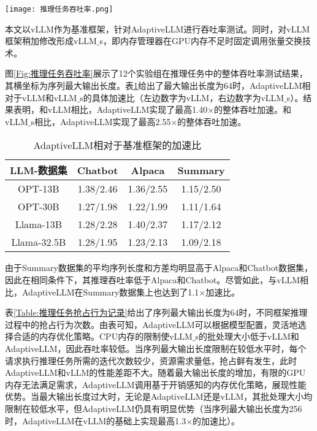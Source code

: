 \begin{figure*}[!htbp]
  \centering
  \texttt{[image: 推理任务吞吐率.png]}
  \caption{推理任务吞吐率}
  \label{Fig:推理任务吞吐率}
\end{figure*}

本文以vLLM作为基准框架，针对AdaptiveLLM进行吞吐率测试。同时，对vLLM框架稍加修改形成vLLM$\_$s，即内存管理器在GPU内存不足时固定调用张量交换技术。

图\ref{Fig:推理任务吞吐率}展示了12个实验组在推理任务中的整体吞吐率测试结果，其横坐标为序列最大输出长度。表\ref{Table:AdaptiveLLM相对于基准框架的加速比}给出了最大输出长度为64时，AdaptiveLLM相对于vLLM和vLLM$\_$s的具体加速比（左边数字为vLLM，右边数字为vLLM$\_$s）。结果表明，和vLLM相比，AdaptiveLLM实现了最高1.40$\times$的整体吞吐加速。和vLLM$\_$s相比，AdaptiveLLM实现了最高2.55$\times$的整体吞吐加速。

\begin{table}[H]
  \centering
  \caption{AdaptiveLLM相对于基准框架的加速比}
  \label{Table:AdaptiveLLM相对于基准框架的加速比}
  \renewcommand{\arraystretch}{1.25}
  \small
  \begin{tabular}{c c c c}
    \toprule
    \textbf{LLM-数据集} & \textbf{Chatbot} & \textbf{Alpaca} & \textbf{Summary} \\
    \midrule
    OPT-13B	& 1.38/2.46 & 1.36/2.55 & 1.15/2.50 \\
    OPT-30B	& 1.27/1.98 & 1.22/1.99 & 1.11/1.64 \\
    Llama-13B & 1.28/2.28 & 1.40/2.37 & 1.17/2.12 \\
    Llama-32.5B & 1.28/1.95 & 1.23/2.13 & 1.09/2.18 \\
    \bottomrule
  \end{tabular}
\end{table}

由于Summary数据集的平均序列长度和方差均明显高于Alpaca和Chatbot数据集，因此在相同条件下，其推理吞吐率低于Alpaca和Chatbot。尽管如此，与vLLM相比，AdaptiveLLM在Summary数据集上也达到了1.1$\times$加速比。

表\ref{Table:推理任务抢占行为记录}给出了序列最大输出长度为64时，不同框架推理过程中的抢占行为次数。由表可知，AdaptiveLLM可以根据模型配置，灵活地选择合适的内存优化策略。CPU内存的限制使vLLM$\_$s的批处理大小低于vLLM和AdaptiveLLM，因此吞吐率较低。当序列最大输出长度限制在较低水平时，每个请求执行推理任务所需的迭代次数较少，资源需求量低，抢占鲜有发生，此时AdaptiveLLM和vLLM的性能差距不大。随着最大输出长度的增加，有限的GPU内存无法满足需求，AdaptiveLLM调用基于开销感知的内存优化策略，展现性能优势。当最大输出长度过大时，无论是AdaptiveLLM还是vLLM，其批处理大小均限制在较低水平，但AdaptiveLLM仍具有明显优势（当序列最大输出长度为256时，AdaptiveLLM在vLLM的基础上实现最高1.3$\times$的加速比）。

